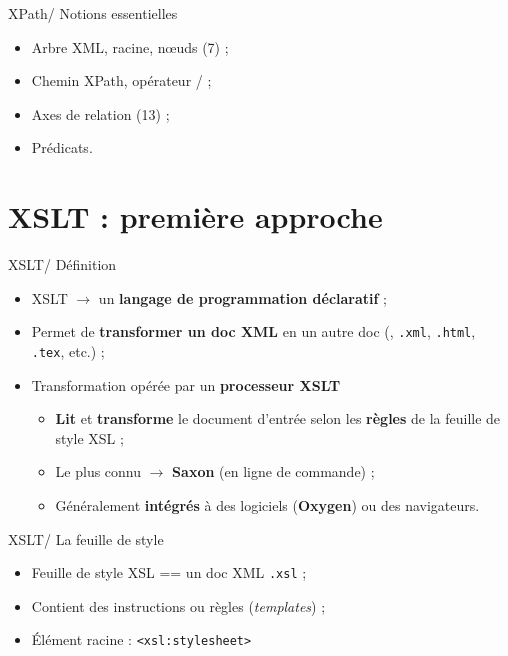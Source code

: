 \documentclass{beamer}
\begin{document}
    \begin{frame}{XPath/ Notions essentielles}
        \Large
        \begin{itemize}
            \item Arbre XML, racine, n\oe uds (7) ;
            \item Chemin XPath, opérateur / ;
            \item Axes de relation (13) ;
            \item Prédicats.
        \end{itemize}
    \end{frame}

    \section{XSLT : première approche}

    \begin{frame}{XSLT/ Définition}
        \Large
        \begin{itemize}
            \item XSLT $\rightarrow$ un \textbf{langage de programmation déclaratif} ;
            \item Permet de \textbf{transformer un doc XML} en un autre doc  (, \texttt{.xml}, \texttt{.html}, \texttt{.tex}, etc.) ;
            \item Transformation opérée par un \textbf{processeur XSLT}
            \begin{itemize}
                \item \textbf{Lit} et \textbf{transforme} le document d'entrée selon les \textbf{règles} de la feuille de style XSL ;
                \item Le plus connu $\rightarrow$ \textbf{Saxon} (en ligne de commande) ;
                \item Généralement \textbf{intégrés} à des logiciels (\textbf{Oxygen}) ou des navigateurs.
            \end{itemize}
        \end{itemize}
    \end{frame}

    \begin{frame}[fragile]{XSLT/ La feuille de style}
    \Large
        \begin{itemize}
            \item Feuille de style XSL == un doc XML \texttt{.xsl} ;
            \item Contient des instructions ou règles (\textit{templates})  ;
            \item Élément racine : \texttt{<xsl:stylesheet>}
        \end{itemize}
    \end{frame}
\end{document}
